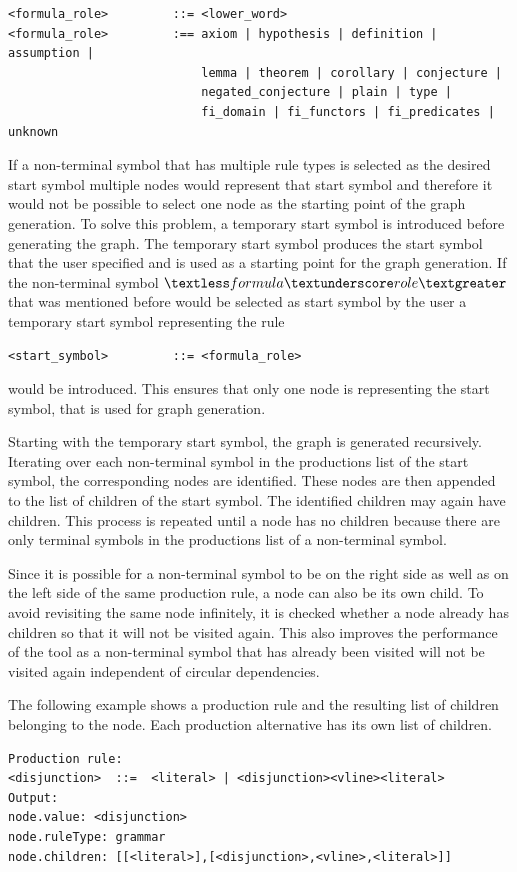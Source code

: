\begin{verbatim}
<formula_role>         ::= <lower_word>
<formula_role>         :== axiom | hypothesis | definition | assumption |
                           lemma | theorem | corollary | conjecture |
                           negated_conjecture | plain | type |
                           fi_domain | fi_functors | fi_predicates | unknown
\end{verbatim}

If a non-terminal symbol that has multiple rule types is selected as the desired start symbol multiple nodes would represent that start symbol and therefore it would not be possible to select one node as the starting point of the graph generation.
To solve this problem, a temporary start symbol is introduced before generating the graph.
The temporary start symbol produces the start symbol that the user specified and is used as a starting point for the graph generation.
If the non-terminal symbol $\textless formula\textunderscore role\textgreater$ that was mentioned before would be selected as start symbol by the user a temporary start symbol representing the rule
\begin{verbatim}
<start_symbol>         ::= <formula_role>
\end{verbatim}
would be introduced.
This ensures that only one node is representing the start symbol, that is used for graph generation.

Starting with the temporary start symbol, the graph is generated recursively. Iterating over each non-terminal symbol in the productions list of the start symbol, the corresponding nodes are identified. These nodes are then appended to the list of children of the start symbol. The identified children may again have children. This process is repeated until a node has no children because there are only terminal symbols in the productions list of a non-terminal symbol.

Since it is possible for a non-terminal symbol to be on the right side as well as on the left side of the same production rule, a node can also be its own child. To avoid revisiting the same node infinitely, it is checked whether a node already has children so that it will not be visited again. This also improves the performance of the tool as a non-terminal symbol that has already been visited will not be visited again independent of circular dependencies.

The following example shows a production rule and the resulting list of children belonging to the node. Each production alternative has its own list of children. %
\begin{verbatim}
Production rule:
<disjunction>  ::=  <literal> | <disjunction><vline><literal>
Output:
node.value: <disjunction>
node.ruleType: grammar
node.children: [[<literal>],[<disjunction>,<vline>,<literal>]]
\end{verbatim}


